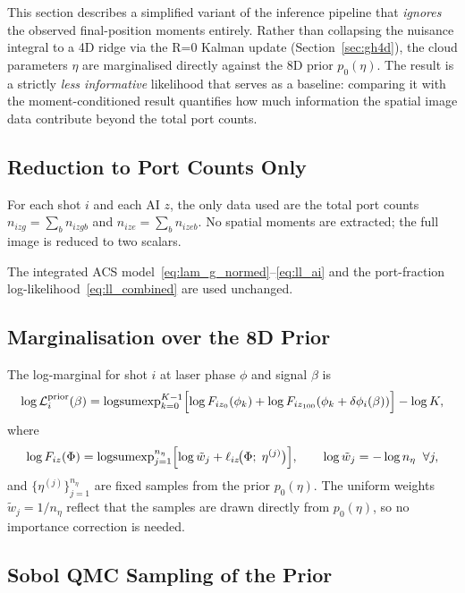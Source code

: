\documentclass[11pt,a4paper]{article}
\begin{document}
This section describes a simplified variant of the inference pipeline that
\emph{ignores} the observed final-position moments entirely.  Rather than
collapsing the nuisance integral to a 4D ridge via the R=0 Kalman update
(Section~\ref{sec:gh4d}), the cloud parameters $\eta$ are marginalised
directly against the 8D prior $p_0(\eta)$.  The result is a strictly
\emph{less informative} likelihood that serves as a baseline: comparing it
with the moment-conditioned result quantifies how much information the spatial
image data contribute beyond the total port counts.

\subsection{Reduction to Port Counts Only}

For each shot $i$ and each AI $z$, the only data used are the total port
counts $n_{izg} = \sum_b n_{izgb}$ and $n_{ize} = \sum_b n_{izeb}$.  No
spatial moments are extracted; the full image is reduced to two scalars.

The integrated ACS model~\eqref{eq:lam_g_normed}--\eqref{eq:ll_ai} and the
port-fraction log-likelihood~\eqref{eq:ll_combined} are used unchanged.

\subsection{Marginalisation over the 8D Prior}
\label{sec:prior8d_marg}

The log-marginal for shot $i$ at laser phase $\phi$ and signal $\beta$ is
\begin{equation}
  \log\mathcal{L}_i^{\rm prior}(\beta)
  = \operatorname{logsumexp}_{k=0}^{K-1}
    \Bigl[
      \log F_{iz_0}(\phi_k)
      + \log F_{iz_{100}}(\phi_k + \delta\phi_i(\beta))
    \Bigr] - \log K,
  \label{eq:logLi_prior}
\end{equation}
where
\begin{equation}
  \log F_{iz}(\Phi)
  = \operatorname{logsumexp}_{j=1}^{n_\eta}
    \Bigl[\log\tilde w_j + \ell_{iz}\!\bigl(\Phi;\;\eta^{(j)}\bigr)\Bigr],
  \qquad
  \log\tilde w_j = -\log n_\eta \;\;\forall j,
  \label{eq:logF_iz_prior}
\end{equation}
and $\{\eta^{(j)}\}_{j=1}^{n_\eta}$ are fixed samples from the prior
$p_0(\eta)$.  The uniform weights $\tilde w_j = 1/n_\eta$ reflect that
the samples are drawn directly from $p_0(\eta)$, so no importance
correction is needed.

\subsection{Sobol QMC Sampling of the Prior}
\label{sec:prior8d_qmc}
\end{document}
